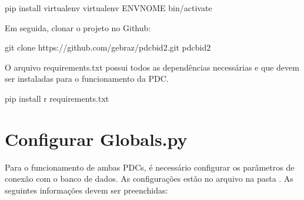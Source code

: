 \documentclass[letterpaper,10pt,brazil]{sphinxmanual}
\begin{document}
\begin{sphinxVerbatim}[commandchars=\\\{\}]
pip install virtualenv
virtualenv ENV\PYGZus{}NOME
  bin/activate
\end{sphinxVerbatim}

\sphinxAtStartPar
Em seguida, clonar o projeto no Github:

\begin{sphinxVerbatim}[commandchars=\\\{\}]
 git clone https://github.com/gebraz/pdcbid2.git
  pdcbid2
\end{sphinxVerbatim}

\sphinxAtStartPar
O arquivo requirements.txt possui todos as dependências necessárias e que devem ser
instaladas para o funcionamento da PDC.

\begin{sphinxVerbatim}[commandchars=\\\{\}]
 pip install \PYGZhy{}r requirements.txt
\end{sphinxVerbatim}


\section{Configurar Globals.py}
\label{\detokenize{usage:configurar-globals-py}}
\sphinxAtStartPar
Para o funcionamento de ambas PDCs, é necessário configurar os parâmetros de
conexão com o banco de dados.
As configurações estão no arquivo  na pasta .
As seguintes informações devem ser preenchidas:

\begin{sphinxVerbatim}[commandchars=\\\{\}]
  
  
  
  
\end{sphinxVerbatim}
\end{document}
